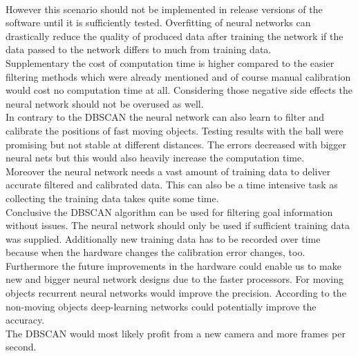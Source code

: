 \documentclass[lnicst,a4paper]{svmultln}
\begin{document}
\\
However this scenario should not be implemented in release versions of the software until it is sufficiently tested. Overfitting of neural networks can drastically reduce the quality of produced data after training the network if the data passed to the network differs to much from training data.
\\
Supplementary the cost of computation time is higher compared to the easier filtering methods which were already mentioned and of course manual calibration would cost no computation time at all. Considering those negative side effects the neural network should not be overused as well.
\\
In contrary to the DBSCAN the neural network can also learn to filter and calibrate the positions of fast moving objects. Testing results with the ball were promising but not stable at different distances. The errors decreased with bigger neural nets but this would also heavily increase the computation time.
\\
Moreover the neural network needs a vast amount of training data to deliver accurate filtered and calibrated data. This can also be a time intensive task as collecting the training data takes quite some time.
\\
Conclusive the DBSCAN algorithm can be used for filtering goal information without issues. The neural network should only be used if sufficient training data was supplied. Additionally new training data has to be recorded over time because when the hardware changes the calibration error changes, too.
\\
Furthermore the future improvements in the hardware could enable us to make new and bigger neural network designs due to the faster processors. For moving objects recurrent neural networks would improve the precision. According to the non-moving objects deep-learning networks could potentially improve the accuracy.
\\
The DBSCAN would most likely profit from a new camera and more frames per second.
\end{document}
